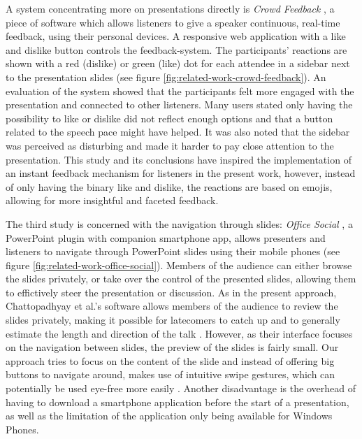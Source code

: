 A system concentrating more on presentations directly is \emph{Crowd Feedback} \cite{Teevan:MobileFeedbackDuringPresentation}, a piece of software which allows listeners to give a speaker continuous, real-time feedback, using their personal devices. A responsive web application with a like and dislike button controls the feedback-system. The participants' reactions are shown with a red (dislike) or green (like) dot for each attendee in a sidebar next to the presentation slides (see figure \ref{fig:related-work-crowd-feedback}). An evaluation of the system showed that the participants felt more engaged with the presentation and connected to other listeners. Many users stated only having the possibility to like or dislike did not reflect enough options and that a button related to the speech pace might have helped. It was also noted that the sidebar was perceived as disturbing and made it harder to pay close attention to the presentation. This study and its conclusions have inspired the implementation of an instant feedback mechanism for listeners in the present work, however, instead of only having the binary like and dislike, the reactions are based on emojis, allowing for more insightful and faceted feedback.

The third study is concerned with the navigation through slides: \emph{Office Social} \cite{Chattopadhyay:OfficeSocialRemoteControl}, a PowerPoint plugin with companion smartphone app, allows presenters and listeners to navigate through PowerPoint slides using their mobile phones (see figure \ref{fig:related-work-office-social}). Members of the audience can either browse the slides privately, or take over the control of the presented slides, allowing them to effictively steer the presentation or discussion. As in the present approach, Chattopadhyay et al.'s software allows members of the audience to review the slides privately, making it possible for latecomers to catch up and to generally estimate the length and direction of the talk \cite{Chattopadhyay:OfficeSocialRemoteControl}. However, as their interface focuses on the navigation between slides, the preview of the slides is fairly small. Our approach tries to focus on the content of the slide and instead of offering big buttons to navigate around, makes use of intuitive swipe gestures, which can potentially be used eye-free more easily \cite{Negulescu:TapSwipeMove}. Another disadvantage is the overhead of having to download a smartphone application before the start of a presentation, as well as the limitation of the application only being available for Windows Phones.

